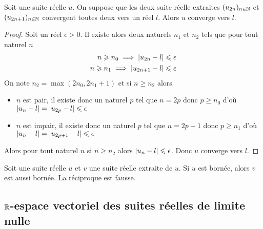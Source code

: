\begin{prop}
  Soit une suite réelle \(u\). On suppose que les deux suite réelle extraites \((u_{2n})_{n \in \mathbb{N}}\) et \((u_{2n+1})_{n \in \mathbb{N}}\) convergent toutes deux vers un réel \(l\). Alors \(u\) converge vers \(l\).
\end{prop}
\begin{proof}
  Soit un réel \(\epsilon>0\). Il existe alors deux naturels \(n_1\) et \(n_2\) tels que pour tout naturel \(n\)
  \begin{align}
    n \geqslant n_0 \implies \left\lvert u_{2n}-l\right\rvert \leqslant \epsilon \\  n \geqslant n_1 \implies \left\lvert u_{2n+1}-l\right\rvert \leqslant \epsilon
  \end{align}
  On note \(n_2=\max(2n_0,2n_1+1)\) et si \(n \geqslant n_2\) alors
  \begin{itemize}
  \item \(n\) est pair, il existe donc un naturel \(p\) tel que \(n=2p\) donc \(p\geqslant n_0\) d'où \(\left\lvert u_n-l\right\rvert=\left\lvert u_{2p}-l\right\rvert \leqslant \epsilon\)
  \item \(n\) est impair, il existe donc un naturel \(p\) tel que \(n=2p+1\) donc \(p\geqslant n_1\) d'où \(\left\lvert u_n-l\right\rvert=\left\lvert u_{2p+1}-l\right\rvert \leqslant \epsilon\)
  \end{itemize}
  Alors pour tout naturel \(n\) si \(n \geqslant n_2\) alors \(\left\lvert u_n-l\right\rvert \leqslant \epsilon\). Donc \(u\) converge vers \(l\).
\end{proof}
\begin{prop}
  Soit une suite réelle \(u\) et \(v\) une suite réelle extraite de \(u\). Si \(u\) est bornée, alors \(v\) est aussi bornée. La réciproque est fausse.
\end{prop}

\subsection{\(\mathbb{R}\)-espace vectoriel des suites réelles de limite nulle}

